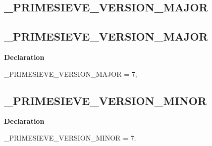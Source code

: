 \documentclass{report}
\newif\ifpdf
\begin{document}
\subsection*{\large{\textbf{{\_}PRIMESIEVE{\_}VERSION{\_}MAJOR}}\normalsize\hspace{1ex}\hrulefill}
\else
\subsection*{{\_}PRIMESIEVE{\_}VERSION{\_}MAJOR}
\fi
\label{primesieve-_PRIMESIEVE_VERSION_MAJOR}
\begin{list}{}{
\setlength{\itemindent}{0cm}
\setlength{\listparindent}{0cm}
\setlength{\leftmargin}{\evensidemargin}
\addtolength{\leftmargin}{\tmplength}
\settowidth{\labelsep}{X}
\addtolength{\leftmargin}{\labelsep}
\setlength{\labelwidth}{\tmplength}
}
\item[\textbf{Declaration}\hfill]
\ifpdf
\begin{flushleft}
\fi
\begin{ttfamily}
{\_}PRIMESIEVE{\_}VERSION{\_}MAJOR = 7;\end{ttfamily}

\ifpdf
\end{flushleft}
\fi

\end{list}
\ifpdf
\subsection*{\large{\textbf{{\_}PRIMESIEVE{\_}VERSION{\_}MINOR}}\normalsize\hspace{1ex}\hrulefill}
\else
\subsection*{{\_}PRIMESIEVE{\_}VERSION{\_}MINOR}
\fi
\label{primesieve-_PRIMESIEVE_VERSION_MINOR}
\begin{list}{}{
\setlength{\itemindent}{0cm}
\setlength{\listparindent}{0cm}
\setlength{\leftmargin}{\evensidemargin}
\addtolength{\leftmargin}{\tmplength}
\settowidth{\labelsep}{X}
\addtolength{\leftmargin}{\labelsep}
\setlength{\labelwidth}{\tmplength}
}
\item[\textbf{Declaration}\hfill]
\ifpdf
\begin{flushleft}
\fi
\begin{ttfamily}
{\_}PRIMESIEVE{\_}VERSION{\_}MINOR = 7;\end{ttfamily}

\ifpdf
\end{flushleft}
\fi

\end{list}
\ifpdf
\end{document}
